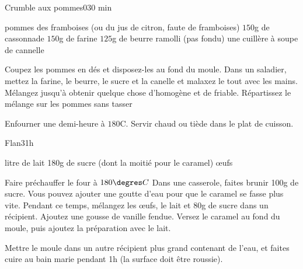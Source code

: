 \begin{recette}{Crumble aux pommes}{0}{}{30 min}
\begin{ingredients}
 pommes
\ingredient des framboises (ou du jus de citron, faute de framboises)
\ingredient $150$g de cassonnade
\ingredient $150$g de farine
\ingredient $125$g de beurre ramolli (pas fondu)
\ingredient une cuillère à soupe de cannelle
\end{ingredients}

\begin{preparation}
\etape Coupez les pommes en dés et disposez-les au fond du moule.
\etape Dans un saladier, mettez la farine, le beurre, le sucre et la canelle et malaxez le tout avec les mains. Mélangez jusqu'à obtenir quelque chose d'homogène et de friable.
\etape Répartissez le mélange sur les pommes sans tasser
\end{preparation}

\begin{cuisson}
Enfourner une demi-heure à $180$\degres C. Servir chaud ou tiède dans le plat de cuisson.
\end{cuisson}
\end{recette}


\begin{recette}{Flan}{3}{}{1h}
\begin{ingredients}
 litre de lait
\ingredient 180g de sucre (dont la moitié pour le caramel)
 œufs
\end{ingredients}

\begin{preparation}
\etape Faire préchauffer le four à $180\degres C$
\etape Dans une casserole, faites brunir 100g de sucre. Vous pouvez ajouter une goutte d'eau pour que le caramel se fasse plus vite.
\etape Pendant ce temps, mélangez les œufs, le lait et 80g de sucre dans un récipient. Ajoutez une gousse de vanille fendue.
\etape Versez le caramel au fond du moule, puis ajoutez la préparation avec le lait.
\end{preparation}

\begin{cuisson}
Mettre le moule dans un autre récipient plus grand contenant de l'eau, et faites cuire au bain marie pendant 1h (la surface doit être roussie).
\end{cuisson}
\end{recette}


